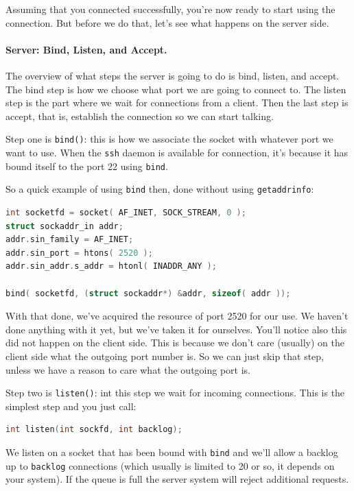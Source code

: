 Assuming that you connected successfully, you're now ready to start using the connection. But before we do that, let's see what happens on the server side.

\paragraph{Server: Bind, Listen, and Accept.}
The overview of what steps the server is going to do is bind, listen, and accept. The bind step is how we choose what port we are going to connect to. The listen step is the part where we wait for connections from a client. Then the last step is accept, that is, establish the connection so we can start talking.

Step one is \texttt{bind()}: this is how we associate the socket with whatever port we want to use. When the \texttt{ssh} daemon is available for connection, it's because it has bound itself to the port 22 using \texttt{bind}. 

So a quick example of using \texttt{bind} then, done without using \texttt{getaddrinfo}:

\begin{lstlisting}[language=C]
int socketfd = socket( AF_INET, SOCK_STREAM, 0 );
struct sockaddr_in addr;
addr.sin_family = AF_INET;
addr.sin_port = htons( 2520 );
addr.sin_addr.s_addr = htonl( INADDR_ANY );

bind( socketfd, (struct sockaddr*) &addr, sizeof( addr ));
\end{lstlisting}

With that done, we've acquired the resource of port 2520 for our use. We haven't done anything with it yet, but we've taken it for ourselves. You'll notice also this did not happen on the client side. This is because we don't care (usually) on the client side what the outgoing port number is. So we can just skip that step, unless we have a reason to care what the outgoing port is.

Step two is \texttt{listen()}: int this step we wait for incoming connections. This is the simplest step and you just call:

\begin{lstlisting}[language=C]
int listen(int sockfd, int backlog); 
\end{lstlisting}

We listen on a socket that has been bound with \texttt{bind} and we'll allow a backlog up to \texttt{backlog} connections (which usually is limited to 20 or so, it depends on your system). If the queue is full the server system will reject additional requests.

